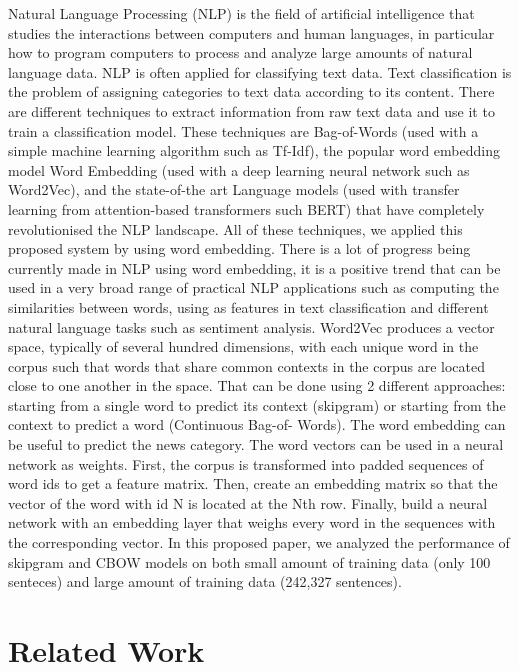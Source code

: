 \documentclass[conference]{IEEEtran}
\begin{document}
Natural Language Processing (NLP) is the field of artificial intelligence that studies the interactions between computers and human languages, in particular how to program computers to process and analyze large amounts of natural language data. NLP is often applied for classifying text data. Text classification is the problem of assigning categories to text data according to its content. There are different techniques to extract information from raw text data and use it to train a classification model. These techniques are Bag-of-Words (used with a simple machine learning algorithm such as Tf-Idf), the popular word embedding model Word Embedding (used with a deep learning neural network such as Word2Vec), and the state-of-the art Language models (used with transfer learning from attention-based transformers such BERT) that have completely revolutionised the NLP landscape. All of these techniques, we applied this proposed system by using word embedding. There is a lot of progress  being currently made in NLP using word embedding, it is a positive trend that can be used in a very broad range of practical NLP applications such as computing the similarities between words, using as features in text classification and different natural language tasks such as sentiment analysis. Word2Vec produces a vector space, typically of several hundred dimensions, with each unique word in the corpus such that words that share common contexts in the corpus are located close to one another in the space. That can be done using 2 different approaches: starting from a single word to predict its context (skipgram) or starting from the context to predict a word (Continuous Bag-of- Words). The word embedding can be useful to predict the news category. The word vectors can be used in a neural network as weights. First, the corpus is transformed into padded sequences of word ids to get a feature matrix. Then, create an embedding matrix so that the vector of the word with id N is located at the Nth row. Finally, build a neural network with an embedding layer that weighs every word in the sequences with the corresponding vector. In this proposed paper, we analyzed the performance of skipgram and CBOW models on both small amount of training data (only 100 senteces) and large amount of training data (242,327 sentences).

\section{Related Work}\label{Sec:relatedwork}
\end{document}
